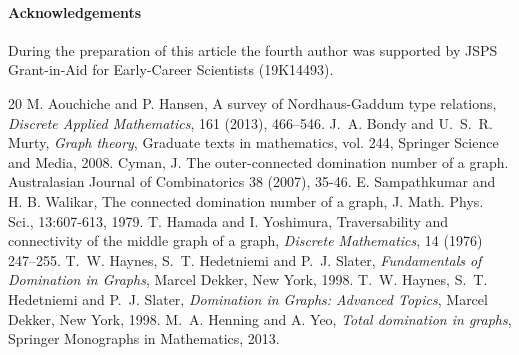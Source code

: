 \documentclass[a4paper,12pt, reqno]{amsart}
\begin{document}
\paragraph{\textbf{Acknowledgements}} During the preparation of this article the fourth author was supported by JSPS Grant-in-Aid for Early-Career Scientists (19K14493). 


\begin{thebibliography}{20}
 M. Aouchiche and P. Hansen, A survey of Nordhaus-Gaddum type relations, {\em Discrete Applied Mathematics}, 161 (2013), 466--546.
 J.~A. Bondy and U.~S.~R. Murty, {\em Graph theory},  Graduate texts in mathematics, vol. 244, Springer Science and Media, 2008.
 Cyman, J. The outer-connected domination number of a graph. Australasian Journal of Combinatorics 38 (2007), 35-46.
 E. Sampathkumar and H. B. Walikar, The connected domination number of a
graph, J. Math. Phys. Sci., 13:607-613, 1979.
 T. Hamada and I. Yoshimura, Traversability and connectivity of the middle graph of a graph, {\em Discrete Mathematics}, 14 (1976) 247--255.
  T.~W. Haynes, S.~T. Hedetniemi and P.~J. Slater, {\em Fundamentals of Domination in Graphs}, Marcel Dekker, New York, 1998.
  T.~W. Haynes, S.~T. Hedetniemi and P.~J. Slater, {\em Domination in Graphs: Advanced Topics}, Marcel Dekker, New York, 1998.
 M.~A. Henning and A. Yeo, {\em Total domination in graphs}, Springer Monographs in Mathematics, 2013.


\end{thebibliography}
\end{document}

